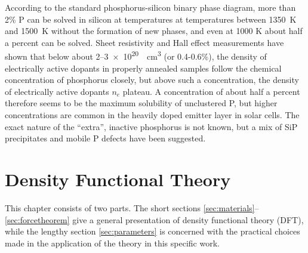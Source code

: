 \documentclass[11pt,bibliography=totoc,index=totoc]{scrbook}   %
\begin{document}
According to the standard phosphorus-silicon binary phase diagram, more than 2\% P can be solved in silicon at temperatures at temperatures between \SI{1350}{\kelvin} and \SI{1500}{\kelvin} without the formation of new phases, and even at 1000 K about half a percent can be solved.\cite{PSiPhaseDiagram} 
Sheet resistivity and Hall effect measurements have shown that below about 2–\SI{3e20}{\per\centi\metre\cubed} (or 0.4-0.6\%), the density of electrically active dopants in properly annealed samples follow the chemical concentration of phosphorus closely, but above such a concentration, the density of electrically active dopants $n_e$ plateau.\cite{Tannenbaum:1961}
A concentration of about half a percent therefore seems to be the maximum solubility of unclustered P,\cite{Solmi:1998} but higher concentrations
are common in the heavily doped emitter layer in solar cells.\cite{Bentzen:2006b}
The exact nature of the ``extra'', inactive phosphorus is not known, but a mix of SiP precipitates and mobile P defects have been suggested.\cite{Armigliato:1976}\cite{Solmi:1996} 


%
\chapter{Density Functional Theory}\label{cha:dft}
%

This chapter consists of two parts. The short sections \ref{sec:materials}--\ref{sec:forcetheorem} give a general presentation of density functional theory (DFT), 
while the lengthy section \ref{sec:parameters} is concerned with the practical choices made in the application of the theory in this specific work.
\end{document}
